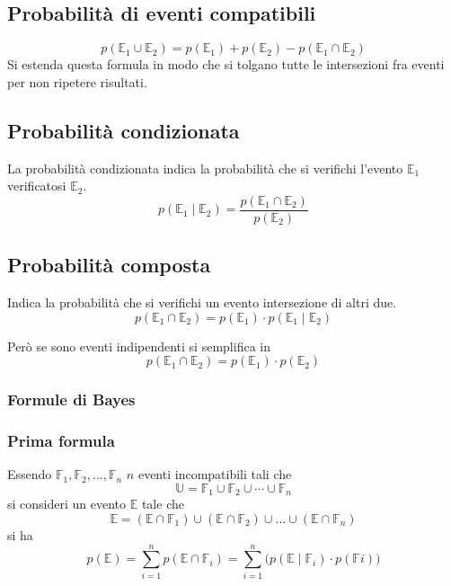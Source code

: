 \subsection{Probabilità di eventi compatibili}
\begin{equation*}
p(\mathbb{E}_1\cup\mathbb{E}_2) = p(\mathbb{E}_1)+p(\mathbb{E}_2)-p(\mathbb{E}_1\cap\mathbb{E}_2)
\end{equation*}
Si estenda questa formula in modo che si tolgano tutte le intersezioni fra eventi per non ripetere 
risultati.

\subsection{Probabilità condizionata}
La probabilità condizionata indica la probabilità che si verifichi l'evento $\mathbb{E}_1$ 
verificatosi $\mathbb{E}_2$.
\begin{equation*}
p\left(\mathbb{E}_1\mid\mathbb{E}_2\right) = 
\frac{p\left(\mathbb{E}_1\cap\mathbb{E}_2\right)}{p(\mathbb{E}_2)}
\end{equation*}

\subsection{Probabilità composta}
Indica la probabilità che si verifichi un evento intersezione di altri due.
\begin{equation*}
p\left(\mathbb{E}_1\cap\mathbb{E}_2\right) = p(\mathbb{E}_1)\cdot
p\left(\mathbb{E}_1\mid\mathbb{E}_2\right)
\end{equation*}

Però se sono eventi indipendenti si semplifica in
\begin{equation*}
p\left(\mathbb{E}_1\cap\mathbb{E}_2\right) = p(\mathbb{E}_1)\cdot p(\mathbb{E}_2)
\end{equation*}

\subsubsection{Formule di Bayes}
\subsubsection{Prima formula}
Essendo $\mathbb{F}_1, \mathbb{F}_2,\dotsc,\mathbb{F}_n$ $n$ eventi incompatibili tali che
\begin{equation*}
\mathbb{U} = \mathbb{F}_1\cup\mathbb{F}_2\cup\dotsb\cup\mathbb{F}_n
\end{equation*}
si consideri un evento $\mathbb{E}$ tale che
\begin{equation*}
\mathbb{E} = \left(\mathbb{E}\cap\mathbb{F}_1\right)\cup\left(\mathbb{E}\cap\mathbb{F}_2\right)\cup
\dots\cup\left(\mathbb{E}\cap\mathbb{F}_n\right)
\end{equation*}
si ha
\begin{equation*}
p(\mathbb{E}) = \sum\limits_{i=1}^{n}p\left(\mathbb{E}\cap\mathbb{F}_i\right) =
\sum\limits_{i=1}^{n}\big(p\left(\mathbb{E}\mid\mathbb{F}_i\right)\cdot 
p\left(\mathbb{F}i\right)\big)
\end{equation*}

